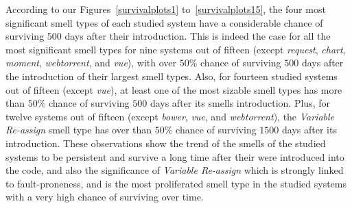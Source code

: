 {According to our Figures~\ref{survivalplots1} to~\ref{survivalplots15}, the four most significant smell types of each studied system have a considerable chance of surviving $500$ days after their introduction. This is indeed the case for all the most significant smell types for nine systems out of fifteen (except \textsl{request}, \textsl{chart}, \textsl{moment}, \textsl{webtorrent}, and \textsl{vue}), with over $50$\% chance of surviving $500$ days after the introduction of their largest smell types. Also, for fourteen studied systems out of fifteen (except \textsl{vue}), at least one of the most sizable smell types has more than $50$\% chance of surviving $500$ days after its smells introduction. Plus, for twelve systems out of fifteen (except \textsl{bower}, \textsl{vue}, and \textsl{webtorrent}), the \textsl{Variable Re-assign} smell type has over than $50$\% chance of surviving $1500$ days after its introduction. These observations show the trend of the smells of the studied systems to be persistent and survive a long time after their were introduced into the code, and also the significance of \textsl{Variable Re-assign} which is strongly linked to fault-proneness, and is the most proliferated smell type in the studied systems with a very high chance of surviving over time.


}
